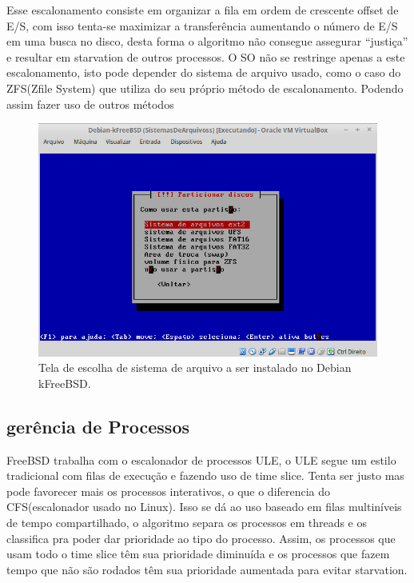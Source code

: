 \documentclass[conference]{IEEEtran}
\begin{document}
Esse escalonamento consiste em organizar a fila em ordem de crescente offset de E/S, com isso tenta-se maximizar a transferência aumentando o número de E/S em uma busca no disco, desta forma o algoritmo não consegue assegurar “justiça” e resultar em starvation de outros processos. 
O SO não se restringe apenas a este escalonamento, isto pode depender do sistema de arquivo usado, como o caso do ZFS(Zfile System) que utiliza do seu próprio método de escalonamento. Podendo assim fazer uso de outros métodos \\
\begin{figure}[h!]
	\centering
	\includegraphics[scale=0.34]{SistemasArquivoskFreeBSD.jpeg}
	\caption{Tela de escolha de sistema de arquivo a ser instalado no Debian kFreeBSD.}
	\label{fig:SisAqrLinux}
\end{figure}
\subsection{gerência de Processos}\label{sec:BSDPROC}
FreeBSD trabalha com o escalonador de processos ULE, o ULE segue um estilo tradicional com filas de execução e fazendo uso de time slice. Tenta ser justo mas pode favorecer mais os processos interativos, o que o diferencia do CFS(escalonador usado no Linux). Isso se dá ao uso baseado em filas multiníveis de tempo compartilhado, o algoritmo  separa os processos em threads e os classifica pra poder dar prioridade ao tipo do processo. Assim, os processos que usam todo o time slice têm sua prioridade diminuída e os processos que fazem tempo que não são rodados têm sua prioridade aumentada para evitar starvation.\\
\end{document}
